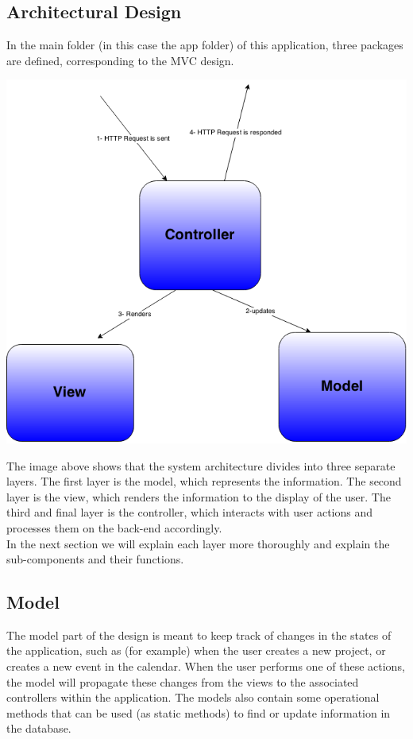 \subsection{Architectural Design} %
\label{sub:arichtectural_design}
%

In the main folder (in this case the app folder) of this application, three packages are defined, corresponding to the MVC design. 
\begin{center}
\includegraphics[scale=0.3]{./img/dsgn_img/MVCdiag.png}
	
\end{center}

The image above shows that the system architecture divides into three separate layers. The first layer is the model, which represents the information. The second layer is the view, which renders the information to the display of the user. The third and final layer is the controller, which interacts with user actions and processes them on the back-end accordingly. \\
In the next section we will explain each layer more thoroughly and explain the sub-components and their functions. 

\subsection{Model} %
\label{sub:design_rationale}
The model part of the design is meant to keep track of changes in the states of the application, such as (for example) when the user creates a new project, or creates a new event in the calendar. When the user performs one of these actions, the model will propagate these changes from the views to the associated controllers within the application. The models also contain some operational methods that can be used (as static methods) to find or update information in the database.
\newpage
